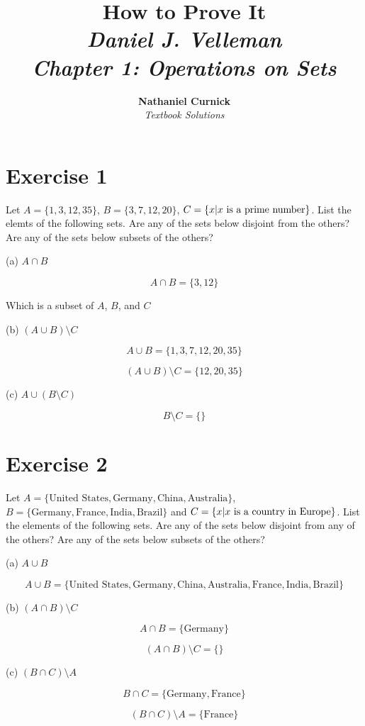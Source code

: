 \documentclass[11pt]{article}
\title{\textbf{How to Prove It} \\ {\Large\itshape Daniel J. Velleman} \\ {\Large\itshape Chapter 1: Operations on Sets}}
\author{\textbf{Nathaniel Curnick} \\ \textit{Textbook Solutions}}
\date{}
\begin{document}
\maketitle

\section*{Exercise 1}

Let $A = \{1,3,12,35\}$, $B = \{3,7,12,20\}$, $C = \{x \text{\textbar} x \text{ is a prime number}\}$. List the elemts of the following sets. 
Are any of the sets below disjoint from the others? Are any of the sets below subsets of the others?

\noindent (a) $A \cap B$

$$A \cap B = \{3,12\}$$

Which is a subset of $A$, $B$, and $C$

\noindent (b) $(A \cup B) \setminus C$

$$A \cup B = \{1,3,7,12,20,35\}$$

$$(A \cup B) \setminus C = \{12, 20, 35\}$$

\noindent (c) $A \cup (B \setminus C)$

$$B \setminus C = \{\}$$

\section*{Exercise 2}

Let $A = \{\text{United States}, \text{Germany}, \text{China}, \text{Australia}\}$, $B = \{\text{Germany}, \text{France}, \text{India}, \text{Brazil}\}$ and $C = \{x \text{\textbar} x \text{ is a country in Europe}\}$. List the elements of the following sets. Are any of the sets below disjoint from any of the others? Are any of the sets below subsets of the others?

\noindent (a) $A \cup B$

$$A \cup B = \{\text{United States}, \text{Germany}, \text{China}, \text{Australia}, \text{France}, \text{India}, \text{Brazil}\}$$

\noindent (b) $(A \cap B) \setminus C$

$$A \cap B = \{\text{Germany}\}$$

$$(A \cap B) \setminus C = \{\}$$

\noindent (c) $(B \cap C) \setminus A$

$$B \cap C = \{\text{Germany}, \text{France}\}$$

$$(B \cap C) \setminus A = \{\text{France}\}$$
\end{document}
